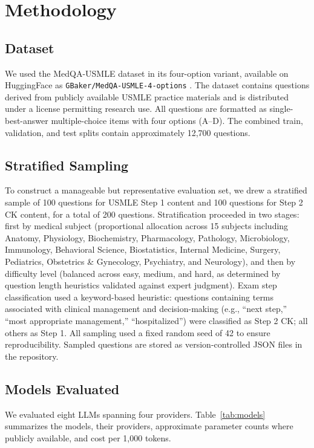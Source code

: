 \section{Methodology}

\subsection{Dataset}

We used the MedQA-USMLE dataset in its four-option variant, available on HuggingFace as \texttt{GBaker/MedQA-USMLE-4-options} \parencite{jin2021medqa}. The dataset contains questions derived from publicly available USMLE practice materials and is distributed under a license permitting research use. All questions are formatted as single-best-answer multiple-choice items with four options (A–D). The combined train, validation, and test splits contain approximately 12,700 questions.

\subsection{Stratified Sampling}

To construct a manageable but representative evaluation set, we drew a stratified sample of 100 questions for USMLE Step 1 content and 100 questions for Step 2 CK content, for a total of 200 questions. Stratification proceeded in two stages: first by medical subject (proportional allocation across 15 subjects including Anatomy, Physiology, Biochemistry, Pharmacology, Pathology, Microbiology, Immunology, Behavioral Science, Biostatistics, Internal Medicine, Surgery, Pediatrics, Obstetrics \& Gynecology, Psychiatry, and Neurology), and then by difficulty level (balanced across easy, medium, and hard, as determined by question length heuristics validated against expert judgment). Exam step classification used a keyword-based heuristic: questions containing terms associated with clinical management and decision-making (e.g., ``next step,'' ``most appropriate management,'' ``hospitalized'') were classified as Step 2 CK; all others as Step 1. All sampling used a fixed random seed of 42 to ensure reproducibility. Sampled questions are stored as version-controlled JSON files in the repository.

\subsection{Models Evaluated}

We evaluated eight LLMs spanning four providers. Table~\ref{tab:models} summarizes the models, their providers, approximate parameter counts where publicly available, and cost per 1,000 tokens.

